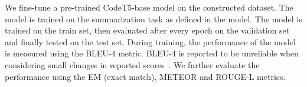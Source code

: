 We fine-tune a pre-trained CodeT5-base model on the constructed dataset. The model is trained on the summarization task as defined in the model. The model is trained on the train set, then evaluated after every epoch on the validation set and finally tested on the test set. During training, the performance of the model is measured using the BLEU-4 metric. BLEU-4 is reported to be unreliable when considering small changes in reported scores~\cite{CodeSumMetrics}. We further evaluate the performance using the EM (exact match), METEOR and ROUGE-L metrics.

